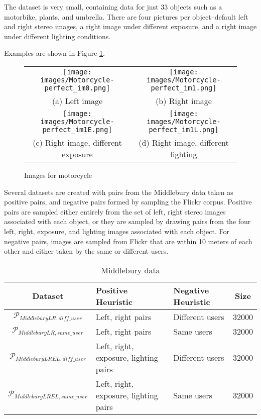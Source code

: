 The dataset is very small, containing data for just 33 objects such as a motorbike, plants, and umbrella. There are four pictures per object--default left and right stereo images, a right image under different exposure, and a right image under different lighting conditions.

Examples are shown in Figure \ref{fig:middlebury}.

\begin{figure}[!htbp]
	\centering
	\begin{tabular}{cc}
		\texttt{[image: images/Motorcycle-perfect\_im0.png]}  &       \texttt{[image: images/Motorcycle-perfect\_im1.png]}  \\
		(a) Left image & (b) Right image\\[6pt]
		\texttt{[image: images/Motorcycle-perfect\_im1E.png]}  &       \texttt{[image: images/Motorcycle-perfect\_im1L.png]} \\
		(c) Right image, different exposure & (d) Right image, different lighting\\[6pt]
	\end{tabular}
	\label{fig:middlebury}
	\caption{Images for motorcycle}
\end{figure}

Several datasets are created with pairs from the Middlebury data taken as positive pairs, and negative pairs formed by sampling the Flickr corpus. Positive pairs are sampled either entirely from the set of left, right stereo images associated with each object, or they are sampled by drawing pairs from the four left, right, exposure, and lighting images associated with each object. For negative pairs, images are sampled from Flickr that are within 10 meters of each other and either taken by the same or different users.

\begin{table}
	\centering
	\begin{tabular}{c >{\centering\arraybackslash}m{3.2cm} >{\centering\arraybackslash}m{3cm} c}
		\toprule
		\bfseries{Dataset} &  \bfseries Positive Heuristic & \bfseries Negative Heuristic & \bfseries{Size}\\
		\midrule
		$\mathcal{P}_{MiddleburyLR,diff\_user}$ & Left, right pairs & Different users  & 32000\\
		$\mathcal{P}_{MiddleburyLR,same\_user}$ & Left, right pairs& Same users  & 32000\\
		$\mathcal{P}_{MiddleburyLREL,diff\_user}$ & Left, right, exposure, lighting pairs  & Different users  & 32000\\
		$\mathcal{P}_{MiddleburyLREL,same\_user}$ & Left, right, exposure, lighting pairs  & Same users  & 32000\\
		\bottomrule
	\end{tabular}
	\caption{Middlebury data}
	\label{table:middlebury}
\end{table}


